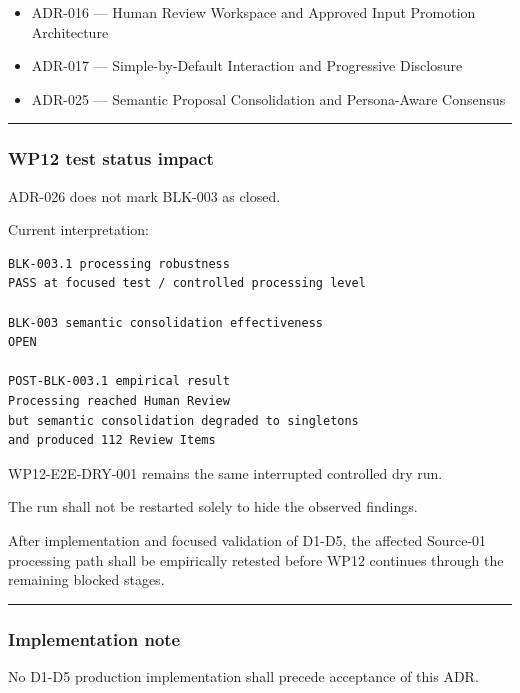 \begin{itemize}
\tightlist
\item
  ADR-016 --- Human Review Workspace and Approved Input Promotion Architecture
\item
  ADR-017 --- Simple-by-Default Interaction and Progressive Disclosure
\item
  ADR-025 --- Semantic Proposal Consolidation and Persona-Aware Consensus
\end{itemize}

\begin{center}\rule{0.5\linewidth}{0.5pt}\end{center}

\hypertarget{wp12-test-status-impact}{%
\subsubsection{WP12 test status impact}\label{wp12-test-status-impact}}

ADR-026 does not mark BLK-003 as closed.

Current interpretation:

\begin{verbatim}
BLK-003.1 processing robustness
PASS at focused test / controlled processing level

BLK-003 semantic consolidation effectiveness
OPEN

POST-BLK-003.1 empirical result
Processing reached Human Review
but semantic consolidation degraded to singletons
and produced 112 Review Items
\end{verbatim}

WP12-E2E-DRY-001 remains the same interrupted controlled dry run.

The run shall not be restarted solely to hide the observed findings.

After implementation and focused validation of D1-D5, the affected Source-01 processing path shall be empirically retested before WP12 continues through the remaining blocked stages.

\begin{center}\rule{0.5\linewidth}{0.5pt}\end{center}

\hypertarget{implementation-note-2}{%
\subsubsection{Implementation note}\label{implementation-note-2}}

No D1-D5 production implementation shall precede acceptance of this ADR.

